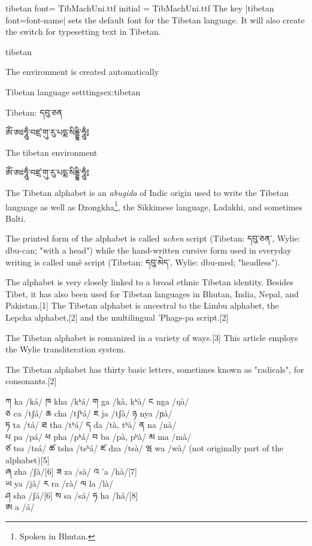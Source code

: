 \begin{docKey}[phd]{tibetan font}{= TibMachUni.ttf} {initial = TibMachUni.ttf} 
The key |tibetan font=font-name| sets the default font for the Tibetan language. It will also create the switch \cmd{\tibetan} for typesetting text in Tibetan.
\end{docKey}


\begin{docEnvironment}{tibetan}{}
\end{docEnvironment}

The environment is created automatically
\begin{texexample}{Tibetan language setttings}{ex:tibetan}
\bgroup
{}

\tibetan Tibetan: དབུ་ཅན\par
ཨོཾ་ཨཿཧཱུྂ་བཛྲ་གུ་རུ་པདྨ་སིདྡྷི་ཧཱུྂ༔\par
\egroup

\begin{tibetanlanguage}
The tibetan environment\par
ཨོཾ་ཨཿཧཱུྂ་བཛྲ་གུ་རུ་པདྨ་སིདྡྷི་ཧཱུྂ༔
\end{tibetanlanguage}
\end{texexample}


The Tibetan alphabet is an \emph{abugida} of Indic origin used to write the Tibetan language as well as Dzongkha\footnote{Spoken in Bhutan.}, the Sikkimese language, Ladakhi, and sometimes Balti. 

The printed form of the alphabet is called \textit{uchen} script (Tibetan: དབུ་ཅན་, Wylie: dbu-can; "with a head") while the hand-written cursive form used in everyday writing is called umê script (Tibetan: དབུ་མེད་, Wylie: dbu-med; "headless").

The alphabet is very closely linked to a broad ethnic Tibetan identity. Besides Tibet, it has also been used for Tibetan languages in Bhutan, India, Nepal, and Pakistan.[1] The Tibetan alphabet is ancestral to the Limbu alphabet, the Lepcha alphabet,[2] and the multilingual 'Phags-pa script.[2]


The Tibetan alphabet is romanized in a variety of ways.[3] This article employs the Wylie transliteration system.

The Tibetan alphabet has thirty basic letters, sometimes known as "radicals", for consonants.[2]

{\tibetanfontfamily
ཀ ka /ká/	ཁ kha /kʰá/	ག ga /kà, kʰà/	ང nga /ŋà/\\
ཅ ca /tʃá/	ཆ cha /tʃʰá/	ཇ ja /tʃà/	ཉ nya /ɲà/\\
ཏ ta /tá/	ཐ tha /tʰá/	ད da /tà, tʰà/	ན na /nà/\\
པ pa /pá/	ཕ pha /pʰá/	བ ba /pà, pʰà/	མ ma /mà/\\
ཙ tsa /tsá/	ཚ tsha /tsʰá/	ཛ dza /tsà/	ཝ wa /wà/ (not originally part of the alphabet)[5]\\
ཞ zha /ʃà/[6]	ཟ za /sà/	འ 'a /hà/[7]\\
ཡ ya /jà/	ར ra /rà/	ལ la /là/\\
ཤ sha /ʃá/[6]	ས sa /sá/	ཧ ha /há/[8]\\
ཨ a /á/\\
}


